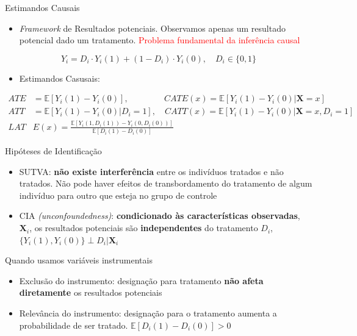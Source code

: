 \documentclass[
  12pt,
  ignorenonframetext,
  aspectratio=169]{beamer}
\providecommand{\tightlist}{%
  \setlength{\itemsep}{0pt}\setlength{\parskip}{0pt}}
\begin{document}
\begin{frame}{Estimandos Causais}
\protect\hypertarget{estimandos-causais}{}
\begin{itemize}
\tightlist
\item
  \emph{Framework} de Resultados potenciais. Observamos apenas um
  resultado potencial dado um tratamento.
  \textcolor{red}{Problema fundamental da inferência causal}
\end{itemize}

\[Y_i=D_i\cdot Y_i(1)+(1-D_i)\cdot Y_i(0), \quad D_i\in\{0, 1\}\]

\begin{itemize}
\tightlist
\item
  Estimandos Casusais:
\end{itemize}

\vspace{-1em}

\begin{align*}
    ATE&=\mathbb{E}[Y_i(1)-Y_i(0)], \qquad\qquad\, CATE(x)=\mathbb{E}[Y_i(1)-Y_i(0)|\mathbf{X}=x]\\
    ATT&=\mathbb{E}[Y_i(1)-Y_i(0)|D_i=1], \quad CATT(x)=\mathbb{E}[Y_i(1)-Y_i(0)|\mathbf{X}=x, D_i=1]\\
     LAT&E(x)=\frac{\mathbb{E}[Y_i(1, D_i(1))-Y_i(0, D_i(0))]}{\mathbb{E}[D_i(1)-D_i(0)]}
\end{align*}
\end{frame}

\begin{frame}{Hipóteses de Identificação}
\protect\hypertarget{hipuxf3teses-de-identificauxe7uxe3o}{}
\begin{itemize}
\item
  SUTVA: \textbf{não existe interferência} entre os indivíduos tratados
  e não tratados. Não pode haver efeitos de transbordamento do
  tratamento de algum indivíduo para outro que esteja no grupo de
  controle
\item
  CIA \emph{(unconfoundedness)}: \textbf{condicionado às características
  observadas}, \(\mathbf{X}_i\), os resultados potenciais são
  \textbf{independentes} do tratamento \(D_i\),
  \(\{Y_i(1), Y_i(0)\} \perp D_i|\mathbf{X}_i\)
\end{itemize}

Quando usamos variáveis instrumentais

\begin{itemize}
\item
  Exclusão do instrumento: designação para tratamento \textbf{não afeta
  diretamente} os resultados potenciais
\item
  Relevância do instrumento: designação para o tratamento aumenta a
  probabilidade de ser tratado. \(\mathbb{E}[D_i(1)-D_i(0)]>0\)
\end{itemize}
\end{frame}
\end{document}

